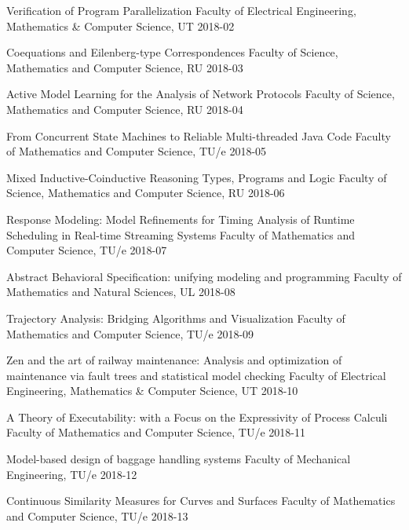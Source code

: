 \begin{multicols}{2}
         {Verification of Program Parallelization}
         {Faculty of Electrical Engineering, Mathematics \& Computer Science, UT}
         {2018-02}

         {Coequations and Eilenberg-type Correspondences}
         {Faculty of Science, Mathematics and Computer Science, RU}
         {2018-03}

         {Active Model Learning for the Analysis of Network Protocols}
         {Faculty of Science, Mathematics and Computer Science, RU}
         {2018-04}

         {From Concurrent State Machines to Reliable Multi-threaded Java Code}
         {Faculty of Mathematics and Computer Science, TU/e}
         {2018-05}

         {Mixed Inductive-Coinductive Reasoning Types, Programs and Logic}
         {Faculty of Science, Mathematics and Computer Science, RU}
         {2018-06}

         {Response Modeling: Model Refinements for Timing Analysis of Runtime Scheduling in Real-time Streaming Systems}
         {Faculty of Mathematics and Computer Science, TU/e}
         {2018-07}

         {Abstract Behavioral Specification: unifying modeling and programming}
         {Faculty of Mathematics and Natural Sciences, UL}
         {2018-08}
         
         {Trajectory Analysis: Bridging Algorithms and Visualization}
         {Faculty of Mathematics and Computer Science, TU/e}
         {2018-09}

         {Zen and the art of railway maintenance: Analysis and optimization of maintenance via fault trees and statistical model checking}
         {Faculty of Electrical Engineering, Mathematics \& Computer Science, UT}
         {2018-10}

         {A Theory of Executability: with a Focus on the Expressivity of Process Calculi}
         {Faculty of Mathematics and Computer Science, TU/e}
         {2018-11}

         {Model-based design of baggage handling systems}
         {Faculty of Mechanical Engineering, TU/e}
         {2018-12}
		 
         {Continuous Similarity Measures for Curves and Surfaces}
         {Faculty of Mathematics and Computer Science, TU/e}
         {2018-13}
		 

\end{multicols}
